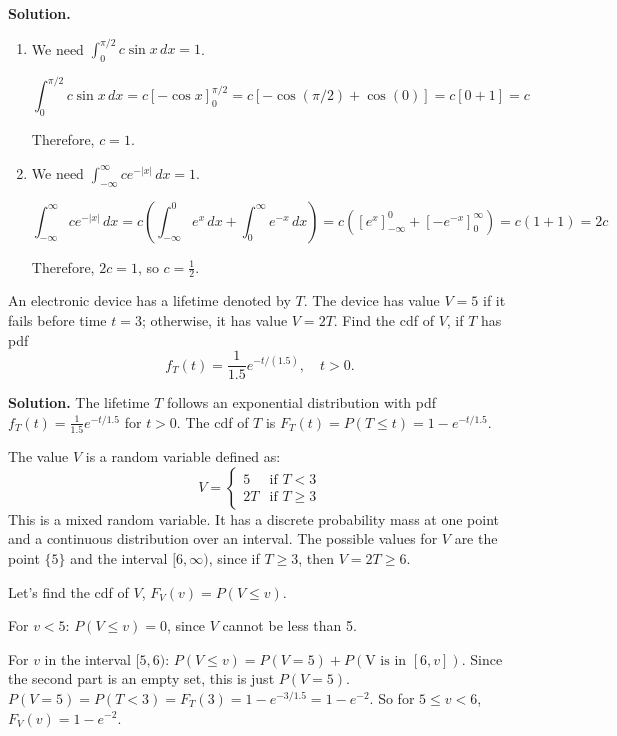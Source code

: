 \noindent\textbf{Solution.}
\begin{enumerate}[label=(\alph*)]
    \item We need $\int_{0}^{\pi/2} c \sin x \, dx = 1$.
    
    \[ \int_{0}^{\pi/2} c \sin x \, dx = c[-\cos x]_{0}^{\pi/2} = c[-\cos(\pi/2) + \cos(0)] = c[0 + 1] = c \]
    
    Therefore, $c = 1$.
    
    \item We need $\int_{-\infty}^{\infty} ce^{-|x|} \, dx = 1$.
    
    \[ \int_{-\infty}^{\infty} ce^{-|x|} \, dx = c \left( \int_{-\infty}^{0} e^{x} \, dx + \int_{0}^{\infty} e^{-x} \, dx \right) = c([e^{x}]_{-\infty}^{0} + [-e^{-x}]_{0}^{\infty}) = c(1 + 1) = 2c \]
    
    Therefore, $2c = 1$, so $c = \frac{1}{2}$.
\end{enumerate}


\begin{problembox}
An electronic device has a lifetime denoted by $T$. The device has value $V = 5$ if it fails before time $t = 3$; otherwise, it has value $V = 2T$. Find the cdf of $V$, if $T$ has pdf
\[ f_T(t) = \frac{1}{1.5} e^{-t/(1.5)}, \quad t > 0. \]
\end{problembox}

\noindent\textbf{Solution.}
The lifetime $T$ follows an exponential distribution with pdf $f_T(t) = \frac{1}{1.5}e^{-t/1.5}$ for $t>0$. The cdf of $T$ is $F_T(t) = P(T \le t) = 1 - e^{-t/1.5}$.

The value $V$ is a random variable defined as:
\[ V = \begin{cases} 5 & \text{if } T < 3 \\ 2T & \text{if } T \ge 3 \end{cases} \]
This is a mixed random variable. It has a discrete probability mass at one point and a continuous distribution over an interval.
The possible values for $V$ are the point $\{5\}$ and the interval $[6, \infty)$, since if $T \ge 3$, then $V = 2T \ge 6$.

Let's find the cdf of $V$, $F_V(v) = P(V \le v)$.

For $v < 5$:
$P(V \le v) = 0$, since $V$ cannot be less than 5.

For $v$ in the interval $[5, 6)$:
$P(V \le v) = P(V=5) + P(\text{V is in } [6, v])$. Since the second part is an empty set, this is just $P(V=5)$.
$P(V=5) = P(T < 3) = F_T(3) = 1 - e^{-3/1.5} = 1 - e^{-2}$.
So for $5 \le v < 6$, $F_V(v) = 1 - e^{-2}$.

